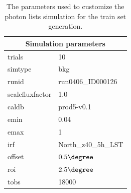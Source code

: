 \begin{table}[]
\centering
\begin{tabular}{|l|l|}
\hline
\multicolumn{2}{|c|}{\textbf{Simulation parameters}} \\
\hline
trials          & 10                  \\ 
simtype         & bkg                 \\ 
runid           & run0406\_ID000126   \\ 
scalefluxfactor & 1.0                 \\ 
caldb           & prod5-v0.1          \\ 
emin            & 0.04                \\ 
emax            & 1                   \\ 
irf             & North\_z40\_5h\_LST \\ 
offset          & $0.5\degree$                \\ 
roi             & $2.5\degree$                 \\ 
tobs            & 18000               \\ \hline
\end{tabular}
\caption{The parameters used to customize the photon lists simulation for the train set generation.}
\label{tab:training-set-fits}
\end{table}
